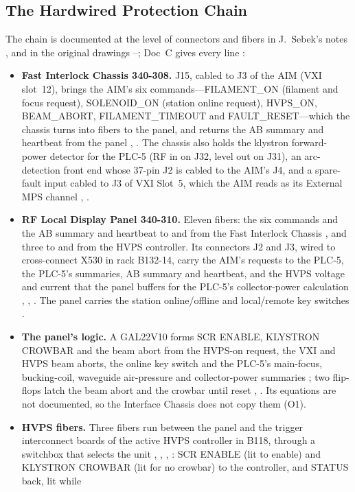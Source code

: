 \subsection{The Hardwired Protection Chain}\label{sec:hwchain}

The chain is documented at the level of connectors and fibers in J.~Sebek's notes
,  and in the original drawings --; Doc~C gives every line
:
\begin{itemize}
\item \textbf{Fast Interlock Chassis 340-308.} J15, cabled to J3 of the AIM (VXI
slot~12), brings the AIM's six commands---FILAMENT\_ON (filament and focus request),
SOLENOID\_ON (station online request), HVPS\_ON, BEAM\_ABORT, FILAMENT\_TIMEOUT and
FAULT\_RESET---which the chassis turns into fibers to the panel, and returns the AB
summary and heartbeat from the panel , . The chassis also holds the
klystron forward-power detector for the PLC-5 (RF in on J32, level out on J31), an
arc-detection front end whose 37-pin J2 is cabled to the AIM's J4, and a spare-fault
input cabled to J3 of VXI Slot~5, which the AIM reads as its External MPS channel
, .
\item \textbf{RF Local Display Panel 340-310.} Eleven fibers: the six commands and
the AB summary and heartbeat to and from the Fast Interlock Chassis , and three
to and from the HVPS controller. Its connectors J2 and J3, wired to cross-connect X530
in rack B132-14, carry the AIM's requests to the PLC-5, the PLC-5's summaries, AB
summary and heartbeat, and the HVPS voltage and current that the panel buffers for
the PLC-5's collector-power calculation , , . The panel carries the
station online/offline and
local/remote key switches .
\item \textbf{The panel's logic.} A GAL22V10 forms SCR ENABLE, KLYSTRON CROWBAR and
the beam abort from the HVPS-on request, the VXI and HVPS beam aborts, the online key
switch and the PLC-5's main-focus, bucking-coil, waveguide air-pressure and
collector-power summaries ; two flip-flops latch the beam abort and the crowbar
until reset , . Its equations are not documented, so the Interface
Chassis does not copy them (O1).
\item \textbf{HVPS fibers.} Three fibers run between the panel and the trigger
interconnect boards of the active HVPS controller in B118, through a switchbox that
selects the unit , , , : SCR ENABLE (lit to enable) and
KLYSTRON CROWBAR (lit for no crowbar) to the controller, and STATUS back, lit while

\end{itemize}
